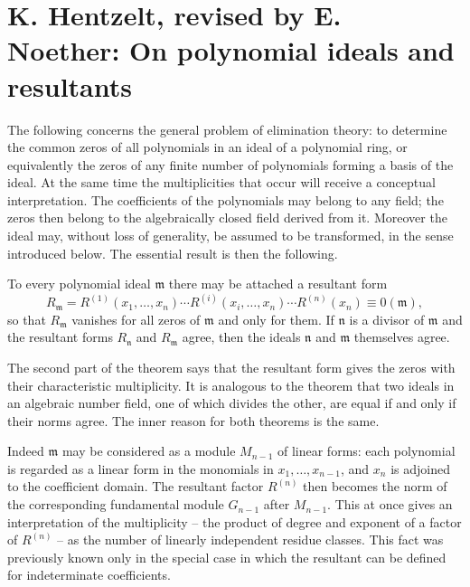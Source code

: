 \documentclass[11pt]{article}
\begin{document}
\newpage

\section{K. Hentzelt, revised by E. Noether: On polynomial ideals and resultants}

The following concerns the general problem of elimination theory: to determine the common zeros of all polynomials in an ideal of a polynomial ring, or equivalently the zeros of any finite number of polynomials forming a basis of the ideal. At the same time the multiplicities that occur will receive a conceptual interpretation. The coefficients of the polynomials may belong to any field; the zeros then belong to the algebraically closed field derived from it. Moreover the ideal may, without loss of generality, be assumed to be transformed, in the sense introduced below. The essential result is then the following.

To every polynomial ideal $\mathfrak m$ there may be attached a resultant form
\begin{equation}
  R_{\mathfrak m}=R^{(1)}(x_1,\ldots,x_n)\cdots R^{(i)}(x_i,\ldots,x_n)\cdots R^{(n)}(x_n)\equiv 0(\mathfrak m),       \tag{A}
\end{equation}
so that $R_{\mathfrak m}$ vanishes for all zeros of $\mathfrak m$ and only for them. If $\mathfrak n$ is a divisor of $\mathfrak m$ and the resultant forms $R_{\mathfrak n}$ and $R_{\mathfrak m}$ agree, then the ideals $\mathfrak n$ and $\mathfrak m$ themselves agree.

The second part of the theorem says that the resultant form gives the zeros with their characteristic multiplicity. It is analogous to the theorem that two ideals in an algebraic number field, one of which divides the other, are equal if and only if their norms agree. The inner reason for both theorems is the same.

Indeed $\mathfrak m$ may be considered as a module $M_{n-1}$ of linear forms: each polynomial is regarded as a linear form in the monomials in $x_1,\ldots,x_{n-1}$, and $x_n$ is adjoined to the coefficient domain. The resultant factor $R^{(n)}$ then becomes the norm of the corresponding fundamental module $G_{n-1}$ after $M_{n-1}$. This at once gives an interpretation of the multiplicity -- the product of degree and exponent of a factor of $R^{(n)}$ -- as the number of linearly independent residue classes. This fact was previously known only in the special case in which the resultant can be defined for indeterminate coefficients.
\end{document}
